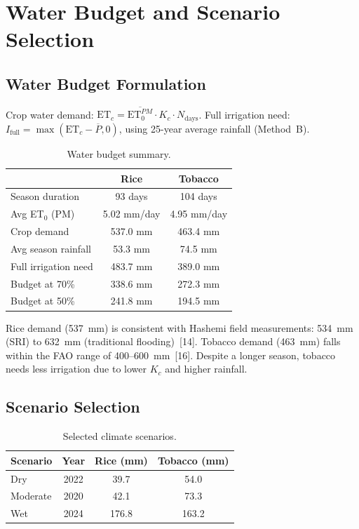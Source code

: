 \documentclass[12pt, a4paper]{article}
\begin{document}
\section{Water Budget and Scenario Selection}

\subsection{Water Budget Formulation}

Crop water demand: $\text{ET}_c = \overline{\text{ET}_0^{PM}} \cdot K_c \cdot N_{\text{days}}$. Full irrigation need: $I_{\text{full}} = \max(\text{ET}_c - \overline{P}, 0)$, using 25-year average rainfall (Method~B).

\begin{table}[H]
\centering
\caption{Water budget summary.}
\label{tab:budget}
\begin{tabular}{lcc}
\toprule
& \textbf{Rice} & \textbf{Tobacco} \\
\midrule
Season duration & 93 days & 104 days \\
Avg ET$_0$ (PM) & 5.02 mm/day & 4.95 mm/day \\
Crop demand & 537.0 mm & 463.4 mm \\
Avg season rainfall & 53.3 mm & 74.5 mm \\
Full irrigation need & 483.7 mm & 389.0 mm \\
Budget at 70\% & 338.6 mm & 272.3 mm \\
Budget at 50\% & 241.8 mm & 194.5 mm \\
\bottomrule
\end{tabular}
\end{table}

Rice demand (537~mm) is consistent with Hashemi field measurements: 534~mm (SRI) to 632~mm (traditional flooding)~[14]. Tobacco demand (463~mm) falls within the FAO range of 400--600~mm~[16]. Despite a longer season, tobacco needs less irrigation due to lower $K_c$ and higher rainfall.

\subsection{Scenario Selection}

\begin{table}[H]
\centering
\caption{Selected climate scenarios.}
\begin{tabular}{lccc}
\toprule
\textbf{Scenario} & \textbf{Year} & \textbf{Rice (mm)} & \textbf{Tobacco (mm)} \\
\midrule
Dry & 2022 & 39.7 & 54.0 \\
Moderate & 2020 & 42.1 & 73.3 \\
Wet & 2024 & 176.8 & 163.2 \\
\bottomrule
\end{tabular}
\end{table}
\end{document}

